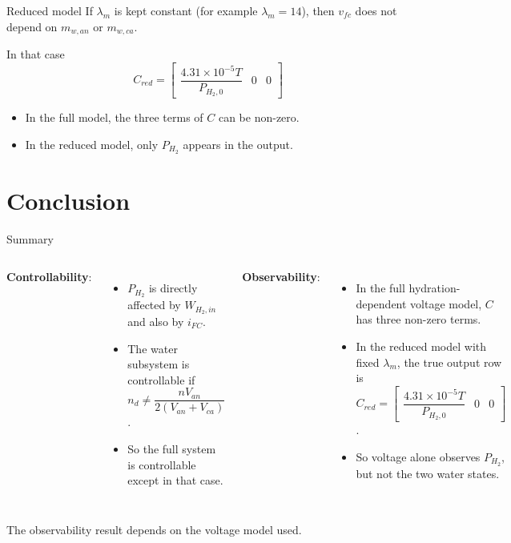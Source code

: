 \documentclass[aspectratio=169]{beamer}
\begin{document}
\begin{frame}{Reduced model}
    If $\lambda_m$ is kept constant (for example $\lambda_m = 14$),
    then $v_{fc}$ does not depend on $m_{w,an}$ or $m_{w,ca}$.

    \medskip
    In that case
    \[
        C_{red} = \begin{bmatrix}
            \dfrac{4.31\times 10^{-5}T}{P_{H_2,0}} & 0 & 0
        \end{bmatrix}
    \]

    \medskip
    \begin{itemize}
        \item In the full model, the three terms of $C$ can be non-zero.
        \item In the reduced model, only $P_{H_2}$ appears in the output.
    \end{itemize}
\end{frame}

\section{Conclusion}

\begin{frame}{Summary}
    \begin{columns}
        \textbf{Controllability}:
        \begin{itemize}
            \item $P_{H_2}$ is directly affected by $W_{H_2,in}$ and also by $i_{FC}$.
            \item The water subsystem is controllable if
                  $n_d \neq \dfrac{nV_{an}}{2(V_{an}+V_{ca})}$.
            \item So the full system is controllable except in that case.
        \end{itemize}
        \textbf{Observability}:
        \begin{itemize}
            \item In the full hydration-dependent voltage model, $C$ has three non-zero terms.
            \item In the reduced model with fixed $\lambda_m$, the true output row is
                  $C_{red} = \begin{bmatrix} \dfrac{4.31\times 10^{-5}T}{P_{H_2,0}} & 0 & 0 \end{bmatrix}$.
            \item So voltage alone observes $P_{H_2}$, but not the two water states.
        \end{itemize}
    \end{columns}
    \medskip
    The observability result depends on the voltage model used.
\end{frame}
\end{document}
